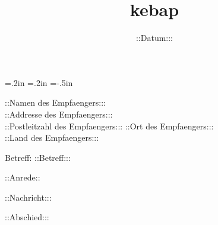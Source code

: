 \oddsidemargin=.2in
\evensidemargin=.2in
\textwidth=5.9in
\topmargin=-.5in
\textheight=9in


\date{::Datum:::}





\begin{letter}{::Namen des Empfaengers::: \\
               ::Addresse des Empfaengers::: \\
               ::Postleitzahl des Empfaengers::: ::Ort des Empfaengers:::\\
               ::Land des Empfaengers::: \\}   

\title{kebap}
\opening{Betreff: ::Betreff:::}

::Anrede::

::Nachricht:::

\closing{::Abschied:::}

\end{letter}


